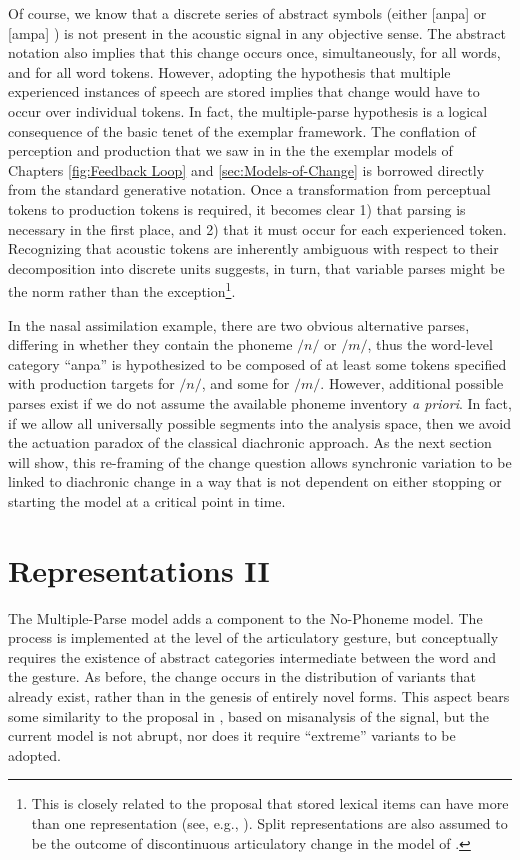 Of course, we know that a discrete series of abstract symbols (either
{[anpa]} or {[ampa]} ) is not present in the acoustic
signal in any objective sense. The abstract notation also implies
that this change occurs once, simultaneously, for all words, and for
all word tokens. However, adopting the hypothesis that multiple experienced
instances of speech are stored implies that change would have to occur
over individual tokens. In fact, the multiple-parse hypothesis is
a logical consequence of the basic tenet of the exemplar framework.
The conflation of perception and production that we saw in in the
the exemplar models of Chapters \ref{fig:Feedback Loop} and \ref{sec:Models-of-Change}
is borrowed directly from the standard generative notation. Once a
transformation from perceptual tokens to production tokens is required,
it becomes clear 1) that parsing is necessary in the first place,
and 2) that it must occur for each experienced token. Recognizing
that acoustic tokens are inherently ambiguous with respect to their
decomposition into discrete units suggests, in turn, that variable
parses might be the norm rather than the exception\footnote{This is closely related to the proposal that stored lexical items
can have more than one representation (see, e.g., \citealp{hooper1976word,Janda2008,Bybee2001}).
Split representations are also assumed to be the outcome of discontinuous
articulatory change in the model of \citet{Garrett2013}.}. 

In the nasal assimilation example, there are two obvious alternative
parses, differing in whether they contain the phoneme $/n/$ or $/m/$,
thus the word-level category “anpa” is hypothesized to be composed
of at least some tokens specified with production targets for $/n/$,
and some for $/m/$. However, additional possible parses exist if
we do not assume the available phoneme inventory \emph{a priori}.
In fact, if we allow all universally possible segments into the analysis
space, then we avoid the actuation paradox of the classical diachronic
approach. As the next section will show, this re-framing of the change
question allows synchronic variation to be linked to diachronic change
in a way that is not dependent on either stopping or starting the
model at a critical point in time. 

\section{Representations II}

The Multiple-Parse model adds a  component to the No-Phoneme
model. The process is implemented at the level of the articulatory
gesture, but conceptually requires the existence of abstract categories
intermediate between the word and the gesture. As before, the change
occurs in the distribution of variants that already exist, rather
than in the genesis of entirely novel forms. This aspect bears some
similarity to the proposal in \citet{Baker2011}, based on misanalysis
of the signal, but the current model is not abrupt, nor does it require
“extreme” variants to be adopted.

